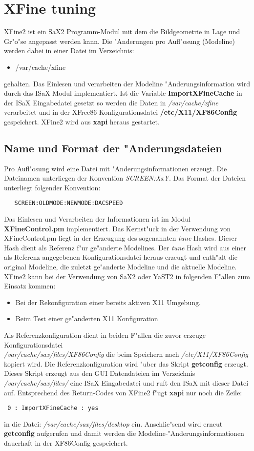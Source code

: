 \chapter{XFine tuning}
\label{cha:xfi}
\minitoc
XFine2 ist ein SaX2 Programm-Modul mit dem die Bildgeometrie
in Lage und Gr"o"se angepasst werden kann. Die "Anderungen pro
Aufl"osung (Modeline) werden dabei in einer Datei im Verzeichnis:
\begin{itemize}
\item /var/cache/xfine
\end{itemize}
gehalten. Das Einlesen und verarbeiten der Modeline "Anderungsinformation
wird durch das ISaX Modul implementiert. Ist die Variable 
\textbf{ImportXFineCache} in der ISaX Eingabedatei gesetzt so werden
die Daten in \textit{/var/cache/xfine} verarbeitet und in
der XFree86 Konfigurationsdatei \textbf{/etc/X11/XF86Config} gespeichert.
XFine2 wird aus \textbf{xapi} heraus gestartet.

\section{Name und Format der "Anderungsdateien}
Pro Aufl"osung wird eine Datei mit "Anderungsinformationen erzeugt.
Die Dateinamen unterliegen der Konvention \textit{SCREEN:XxY}.
Das Format der Dateien unterliegt folgender Konvention:
\begin{verbatim}
   SCREEN:OLDMODE:NEWMODE:DACSPEED
\end{verbatim}

Das Einlesen und Verarbeiten der Informationen ist im Modul
\textbf{XFineControl.pm} implementiert. Das Kernst"uck in der 
Verwendung von XFineControl.pm liegt in der Erzeugung des 
sogenannten \textit{tune} Hashes. Dieser Hash dient 
als Referenz f"ur ge"anderte Modelines. Der \textit{tune} Hash wird
aus einer als Referenz angegebenen Konfigurationsdatei heraus
erzeugt und enth"alt die original Modeline, die zuletzt ge"anderte 
Modeline und die aktuelle Modeline. XFine2 kann bei der Verwendung
von SaX2 oder YaST2 in folgenden F"allen zum Einsatz kommen:
\begin{itemize}
\item Bei der Rekonfiguration einer bereits aktiven X11 Umgebung.
\item Beim Test einer ge"anderten X11 Konfiguration
\end{itemize}
Als Referenzkonfiguration dient in beiden F"allen die zuvor
erzeuge Konfigurationsdatei\\
\textit{/var/cache/sax/files/XF86Config}
die beim Speichern nach \textit{/etc/X11/XF86Config} kopiert wird.
Die Referenzkonfiguration wird "uber das Skript \textbf{getconfig}
erzeugt. Dieses Skript erzeugt aus den GUI Datendateien im Verzeichnis
\textit{/var/cache/sax/files/} eine ISaX Eingabedatei und ruft den
ISaX mit dieser Datei auf. Entsprechend des Return-Codes von XFine2 
f"ugt \textbf{xapi} nur noch die Zeile:
\begin{verbatim}
 0 : ImportXFineCache : yes
\end{verbatim}
in die Datei: \textit{/var/cache/sax/files/desktop} ein.
Anschlie"send wird erneut \textbf{getconfig} aufgerufen und damit werden
die Modeline-"Anderungsinformationen dauerhaft in der XF86Config
gespeichert.
